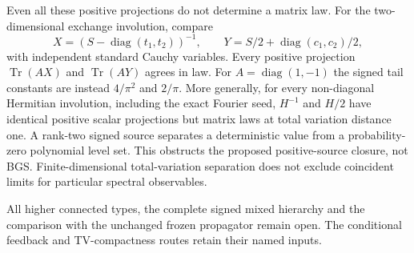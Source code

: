 Even all these positive projections do not determine a matrix law.  For
the two-dimensional exchange involution, compare
\[
 X=(S-\operatorname{diag}(t_1,t_2))^{-1},\qquad
 Y=S/2+\operatorname{diag}(c_1,c_2)/2,
\]
with independent standard Cauchy variables.  Every positive projection
$\operatorname{Tr}(AX)$ and $\operatorname{Tr}(AY)$ agrees in law.
For $A=\operatorname{diag}(1,-1)$ the signed tail constants are instead
$4/\pi^2$ and $2/\pi$.  More generally, for every non-diagonal Hermitian involution, including
the exact Fourier seed, $H^{-1}$ and $H/2$ have identical positive scalar
projections but matrix laws at total variation distance one. A rank-two
signed source separates a deterministic value from a probability-zero
polynomial level set. This obstructs the proposed positive-source closure,
not BGS. Finite-dimensional total-variation separation does not exclude
coincident limits for particular spectral observables.

All higher connected types, the complete signed mixed hierarchy and the
comparison with the unchanged frozen propagator remain open.  The
conditional feedback and TV-compactness routes retain their named inputs.
